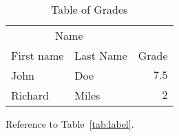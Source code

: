 \documentclass[
10pt, %
a4paper, %
oneside, %
headinclude,footinclude, %
BCOR5mm, %
]{scrartcl}
\begin{document}
\begin{table}[hbt]
\caption{Table of Grades}
\centering
\begin{tabular}{llr}
\toprule
\multicolumn{2}{c}{Name} \\
\cmidrule(r){1-2}
First name & Last Name & Grade \\
\midrule
John & Doe & $7.5$ \\
Richard & Miles & $2$ \\
\bottomrule
\end{tabular}
\label{tab:label}
\end{table}

Reference to Table~\vref{tab:label}. %





%


\end{document}
